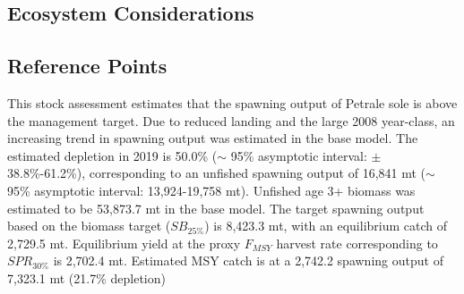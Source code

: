 \documentclass[12pt,]{article}
\begin{document}
\FloatBarrier

\subsection*{Ecosystem Considerations}\label{ecosystem-considerations}

\subsection*{Reference Points}\label{reference-points}

This stock assessment estimates that the spawning output of Petrale sole
is above the management target. Due to reduced landing and the large
2008 year-class, an increasing trend in spawning output was estimated in
the base model. The estimated depletion in 2019 is 50.0\% (\(\sim\) 95\%
asymptotic interval: \(\pm\) 38.8\%-61.2\%), corresponding to an
unfished spawning output of 16,841 mt (\(\sim\) 95\% asymptotic
interval: 13,924-19,758 mt). Unfished age 3+ biomass was estimated to be
53,873.7 mt in the base model. The target spawning output based on the
biomass target (\(SB_{25\%}\)) is 8,423.3 mt, with an equilibrium catch
of 2,729.5 mt. Equilibrium yield at the proxy \(F_{MSY}\) harvest rate
corresponding to \(SPR_{30\%}\) is 2,702.4 mt. Estimated MSY catch is at
a 2,742.2 spawning output of 7,323.1 mt (21.7\% depletion)
\end{document}
